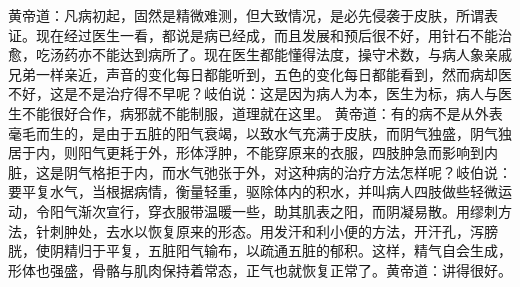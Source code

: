 \documentclass[a4paper,12pt,UTF8,twoside]{ctexbook}
\begin{document}
黄帝道：凡病初起，固然是精微难测，但大致情况，是必先侵袭于皮肤，所谓表证。现在经过医生一看，都说是病已经成，而且发展和预后很不好，用针石不能治愈，吃汤药亦不能达到病所了。现在医生都能懂得法度，操守术数，与病人象亲戚兄弟一样亲近，声音的变化每日都能听到，五色的变化每日都能看到，然而病却医不好，这是不是治疗得不早呢？岐伯说：这是因为病人为本，医生为标，病人与医生不能很好合作，病邪就不能制服，道理就在这里。
黄帝道：有的病不是从外表毫毛而生的，是由于五脏的阳气衰竭，以致水气充满于皮肤，而阴气独盛，阴气独居于内，则阳气更耗于外，形体浮肿，不能穿原来的衣服，四肢肿急而影响到内脏，这是阴气格拒于内，而水气弛张于外，对这种病的治疗方法怎样呢？岐伯说：要平复水气，当根据病情，衡量轻重，驱除体内的积水，并叫病人四肢做些轻微运动，令阳气渐次宣行，穿衣服带温暖一些，助其肌表之阳，而阴凝易散。用缪刺方法，针刺肿处，去水以恢复原来的形态。用发汗和利小便的方法，开汗孔，泻膀胱，使阴精归于平复，五脏阳气输布，以疏通五脏的郁积。这样，精气自会生成，形体也强盛，骨骼与肌肉保持着常态，正气也就恢复正常了。黄帝道：讲得很好。
\end{document}
